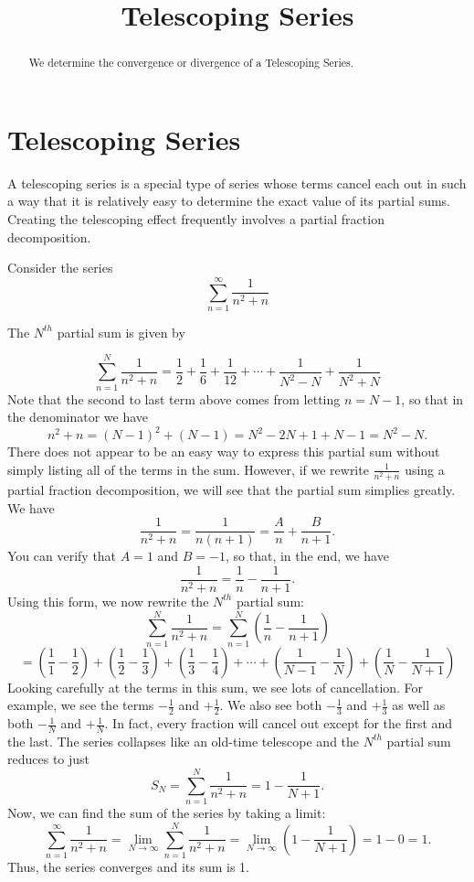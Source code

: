 \documentclass{ximera}
\title{Telescoping Series}
\begin{document}
\begin{abstract}
We determine the convergence or divergence of a Telescoping Series.
\end{abstract}

\maketitle

\section{Telescoping Series}

A telescoping series is a special type of series whose terms cancel each out in such a way that it is relatively easy to determine the
exact value of its partial sums. Creating the telescoping effect frequently involves a partial fraction decomposition.

\begin{example}[example 1]
Consider the series
\[
\sum_{n=1}^\infty \frac{1}{n^2 +n}
\]

The $N^{th}$ partial sum is given by

\[
\sum_{n=1}^N \frac{1}{n^2 +n} = \frac{1}{2} + \frac{1}{6} + \frac{1}{12} + \cdots + \frac{1}{N^2 - N} + \frac{1}{N^2 + N}
\]
Note that the second to last term above comes from letting $n = N-1$, so that in the denominator we have 
\[
n^2 + n = (N-1)^2 + (N-1) = N^2 - 2N + 1 + N - 1 = N^2 -N.
\]
There does not appear to be an easy way to express this partial sum without simply listing all of the terms in the sum.
However, if we rewrite $\frac{1}{n^2 +n}$ using a partial fraction decomposition, we will see that the partial sum simplies greatly.
We have
\[
\frac{1}{n^2 + n} = \frac{1}{n(n+1)} = \frac{A}{n} + \frac{B}{n+1}.
\]
You can verify that $A = 1$ and $B=-1$, so that, in the end, we have
\[
\frac{1}{n^2 + n} = \frac{1}{n} - \frac{1}{n+1}.
\]
Using this form, we now rewrite the $N^{th}$ partial sum:
\[
\sum_{n=1}^N \frac{1}{n^2 +n} = \sum_{n=1}^N \left(\frac{1}{n}-\frac{1}{n+1}\right)
\]
\[
 = \left(\frac11 - \frac12 \right) + \left(\frac12 - \frac13 \right) + \left(\frac13 - \frac14 \right) + \cdots + 
 \left(\frac{1}{N-1} - \frac{1}{N} \right) +\left(\frac{1}{N} - \frac{1}{N+1} \right) 
\]
Looking carefully at the terms in this sum, we see lots of cancellation. For example, we see the terms $-\frac12$ and $+\frac12$.
We also see both $-\frac13$ and $+\frac13$ as well as both $-\frac{1}{N}$ and $+\frac{1}{N}$. In fact, every fraction will cancel out
except for the first and the last. The series collapses like an old-time telescope and the $N^{th}$ partial sum reduces to just
\[
S_N = \sum_{n=1}^N \frac{1}{n^2 +n} = 1 - \frac{1}{N+1}.
\]
Now, we can find the sum of the series by taking a limit:
\[
\sum_{n=1}^\infty  \frac{1}{n^2 +n} = \lim_{N\to \infty} \sum_{n=1}^N  \frac{1}{n^2 +n} = \lim_{N\to \infty} \left(1 - \frac{1}{N+1}\right) = 1-0 = 1.
\]
Thus, the series converges and its sum is 1.
\end{example}
\end{document}

